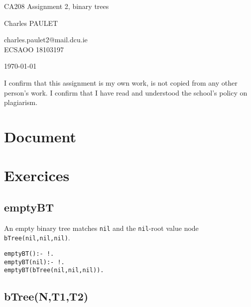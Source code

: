 \documentclass{article}
\begin{document}
\Large
\begin{center}
  CA208 Assignment 2, binary trees\\
  \hspace{10pt}

  \large
  Charles PAULET \\
  \hspace{10pt}

  \small
  charles.paulet2@mail.dcu.ie \\
  ECSAOO 18103197 \\
  \bigbreak

  \today
\end{center}
\hspace{10pt}

\normalsize
I confirm that this assignment is my own work, is not copied from any other
person's work. I confirm that I have read and understood the school's policy
on plagiarism.

\newpage

\section*{Document}

\medbreak
{}

\section*{Exercices}

  \subsection*{emptyBT}

    An empty binary tree matches \texttt{nil} and the
    \texttt{nil}-root value node \texttt{bTree(nil,nil,nil)}.

    \begin{verbatim}
emptyBT():- !.
emptyBT(nil):- !.
emptyBT(bTree(nil,nil,nil)).
    \end{verbatim}

  \subsection*{bTree(N,T1,T2)}
\end{document}
